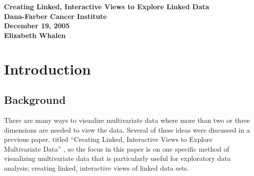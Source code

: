 \documentclass{article}[11pt]
\begin{document}



\begin{titlepage}
\begin{center}
\Large
\vspace*{1in}
\textbf{Creating Linked, Interactive Views to \linebreak Explore Linked Data} \\
\vspace{1in}
\textbf{Dana-Farber Cancer Institute}\\ 
\textbf{December 19, 2005} \\
\vspace{1in} 
\textbf{Elizabeth Whalen} \\
\end{center}
\end{titlepage}
\normalsize
\newpage

\section{Introduction}\label{Sec:Intro}

\subsection{Background}\label{Ssec:Backg}

There are many ways to visualize multivariate data where more than
two or three dimensions are needed to view the data.  Several of these ideas
were discussed in a previous paper, titled ``Creating Linked, Interactive
Views to Explore Multivariate Data'' \cite{EW05}, so the focus in this paper
is on one specific method of visualizing multivariate data that is
particularly useful for exploratory data analysis; creating linked,
interactive views of linked data sets.  
\end{document}
